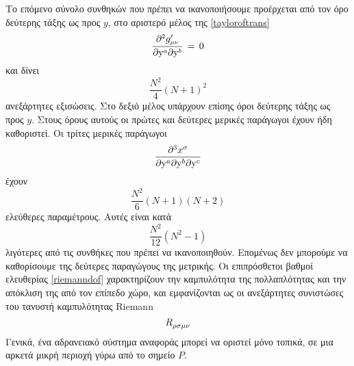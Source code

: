 Το επόμενο σύνολο συνθηκών που πρέπει να ικανοποιήσουμε προέρχεται από τον όρο δεύτερης τάξης ως προς $y$, στο αριστερό μέλος της \eqref{tayloroftrans} 
\begin{equation}
    \spd{\g{\mu}{\nu}'}{\y\superscr{a}}{\y\superscr{b}} \,=\, 0
\end{equation}
και δίνει 
\begin{equation*}
    \frac{N^2}{4}(N+1)^2
\end{equation*}
ανεξάρτητες εξισώσεις. Στο δεξιό μέλος υπάρχουν επίσης όροι δεύτερης τάξης ως προς $y$. Στους όρους αυτούς οι πρώτες και δεύτερες μερικές παράγωγοι έχουν ήδη καθοριστεί. Οι τρίτες μερικές παράγωγοι  
\begin{equation}
    \frac{\partial\superscr{3}x\indices{^\sigma}}{\partial\y\indices{^a}\partial\y\indices{^b}\partial\y\indices{^c}}
\end{equation}
έχουν 
\begin{equation*}
    \frac{N^2}{6}(N+1)(N+2)
\end{equation*}
ελεύθερες παραμέτρους. Αυτές είναι κατά
\begin{equation}\label{riemanndof}
    \frac{N^2}{12}(N^2-1)
\end{equation}
λιγότερες από τις συνθήκες που πρέπει να ικανοποιηθούν. Επομένως δεν μπορούμε να καθορίσουμε της δεύτερες παραγώγους της μετρικής. 
Οι επιπρόσθετοι βαθμοί ελευθερίας \eqref{riemanndof} χαρακτηρίζουν την καμπυλότητα της πολλαπλότητας και την απόκλιση της από τον επίπεδο χώρο, 
και εμφανίζονται ως οι ανεξάρτητες συνιστώσες του τανυστή καμπυλότητας Riemann 
\begin{equation}
    R\indices{_\rho_\sigma_\mu_\nu}
\end{equation}
Γενικά, ένα αδρανειακό σύστημα αναφοράς μπορεί να οριστεί μόνο τοπικά, σε μια αρκετά μικρή περιοχή γύρω από το σημείο $P$.

